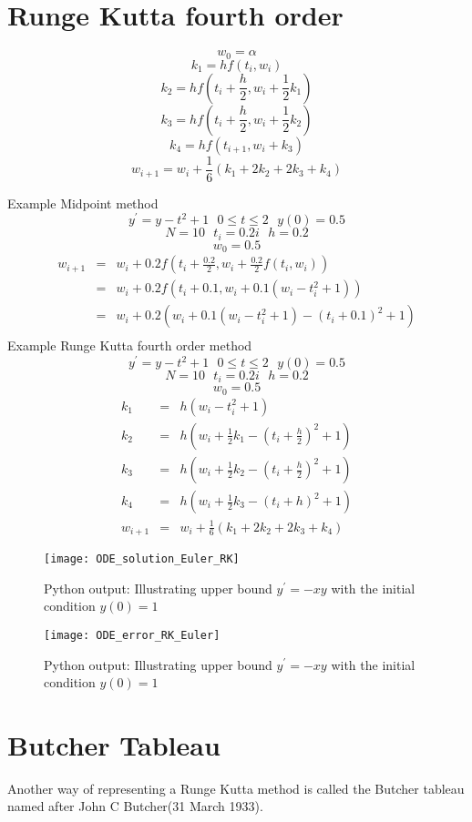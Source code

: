 \section{Runge Kutta fourth order}
\[w_0 = \alpha \]
\[k_1 = hf(t_i,w_i) \]
\[k_2 = hf(t_i+\frac{h}{2},w_i+\frac{1}{2}k_1) \]
\[k_3 = hf(t_i+\frac{h}{2},w_i+\frac{1}{2}k_2) \]
\[k_4 = hf(t_{i+1},w_i+k_3) \]
\[w_{i+1}=w_{i}+\frac{1}{6}(k_1+2k_2+2k_3+k_4) \]
\begin{example}
Example Midpoint method
\[y^{'}=y-t^2+1 \ \ \ 0 \leq t \leq 2 \ \ \ y(0)=0.5 \]
\[N=10 \ \ \ t_i=0.2i \ \ \ h=0.2 \]
\[w_0=0.5 \]
\begin{eqnarray*}
w_{i+1} &=& w_{i} + 0.2f(t_i+\frac{0.2}{2},w_i+\frac{0.2}{2}f(t_i,w_i))\\
 &=& w_{i} + 0.2f(t_i+0.1,w_i+0.1(w_i-t^2_i+1))\\
 &=& w_{i} + 0.2(w_i+0.1(w_i-t^2_i+1)-(t_i+0.1)^2+1)\\
\end{eqnarray*}
Example Runge Kutta fourth order method
\[y^{'}=y-t^2+1 \ \ \ 0 \leq t \leq 2 \ \ \ y(0)=0.5 \]
\[N=10 \ \ \ t_i=0.2i \ \ \ h=0.2 \]
\[w_0=0.5 \]
\begin{eqnarray*}
k_1&=&h(w_i-t_i^2+1)\\
k_2&=&h(w_i+\frac{1}{2}k_1-(t_i+\frac{h}{2})^2+1)\\
k_3&=&h(w_i+\frac{1}{2}k_2-(t_i+\frac{h}{2})^2+1)\\
k_4&=&h(w_i+\frac{1}{2}k_3-(t_i+h)^2+1)\\
w_{i+1} &=& w_{i} + \frac{1}{6}(k_1+2k_2+2k_3+k_4)
\end{eqnarray*}
\begin{figure}[H]
\centering
\texttt{[image: ODE\_solution\_Euler\_RK]}
\caption{Python output: Illustrating upper bound $y^{'}=-xy$ with the initial condition $y(0)=1$ }
\label{RK vs Euler Figure}
\end{figure}
\begin{figure}[H]
\centering
\texttt{[image: ODE\_error\_RK\_Euler]}
\caption{Python output: Illustrating upper bound $y^{'}=-xy$ with the initial condition $y(0)=1$ }
\label{Modified Euler Figure}
\end{figure}
\end{example}
\section{Butcher Tableau}

Another way of representing a Runge Kutta method is called the Butcher tableau named after John C Butcher(31 March 1933).

